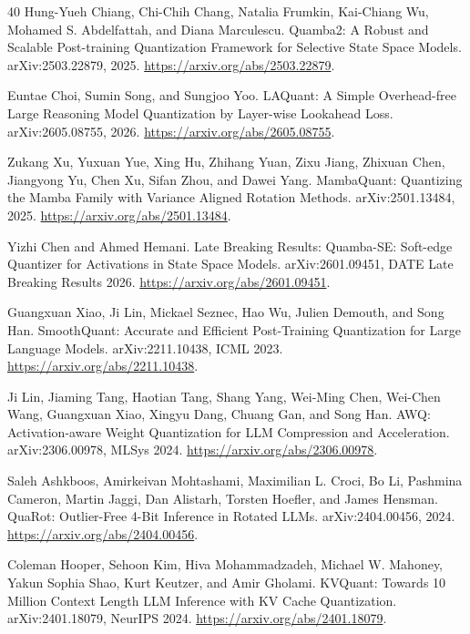 \documentclass{article}
\begin{document}
\begin{thebibliography}{40}
Hung-Yueh Chiang, Chi-Chih Chang, Natalia Frumkin, Kai-Chiang Wu, Mohamed S.
Abdelfattah, and Diana Marculescu.
\newblock Quamba2: A Robust and Scalable Post-training Quantization Framework
for Selective State Space Models.
\newblock arXiv:2503.22879, 2025.
\newblock \url{https://arxiv.org/abs/2503.22879}.

Euntae Choi, Sumin Song, and Sungjoo Yoo.
\newblock LAQuant: A Simple Overhead-free Large Reasoning Model Quantization
by Layer-wise Lookahead Loss.
\newblock arXiv:2605.08755, 2026.
\newblock \url{https://arxiv.org/abs/2605.08755}.

Zukang Xu, Yuxuan Yue, Xing Hu, Zhihang Yuan, Zixu Jiang, Zhixuan Chen,
Jiangyong Yu, Chen Xu, Sifan Zhou, and Dawei Yang.
\newblock MambaQuant: Quantizing the Mamba Family with Variance Aligned
Rotation Methods.
\newblock arXiv:2501.13484, 2025.
\newblock \url{https://arxiv.org/abs/2501.13484}.

Yizhi Chen and Ahmed Hemani.
\newblock Late Breaking Results: Quamba-SE: Soft-edge Quantizer for
Activations in State Space Models.
\newblock arXiv:2601.09451, DATE Late Breaking Results 2026.
\newblock \url{https://arxiv.org/abs/2601.09451}.

Guangxuan Xiao, Ji Lin, Mickael Seznec, Hao Wu, Julien Demouth, and Song Han.
\newblock SmoothQuant: Accurate and Efficient Post-Training Quantization for
Large Language Models.
\newblock arXiv:2211.10438, ICML 2023.
\newblock \url{https://arxiv.org/abs/2211.10438}.

Ji Lin, Jiaming Tang, Haotian Tang, Shang Yang, Wei-Ming Chen, Wei-Chen Wang,
Guangxuan Xiao, Xingyu Dang, Chuang Gan, and Song Han.
\newblock AWQ: Activation-aware Weight Quantization for LLM Compression and
Acceleration.
\newblock arXiv:2306.00978, MLSys 2024.
\newblock \url{https://arxiv.org/abs/2306.00978}.

Saleh Ashkboos, Amirkeivan Mohtashami, Maximilian L. Croci, Bo Li, Pashmina
Cameron, Martin Jaggi, Dan Alistarh, Torsten Hoefler, and James Hensman.
\newblock QuaRot: Outlier-Free 4-Bit Inference in Rotated LLMs.
\newblock arXiv:2404.00456, 2024.
\newblock \url{https://arxiv.org/abs/2404.00456}.

Coleman Hooper, Sehoon Kim, Hiva Mohammadzadeh, Michael W. Mahoney, Yakun
Sophia Shao, Kurt Keutzer, and Amir Gholami.
\newblock KVQuant: Towards 10 Million Context Length LLM Inference with KV
Cache Quantization.
\newblock arXiv:2401.18079, NeurIPS 2024.
\newblock \url{https://arxiv.org/abs/2401.18079}.


\end{thebibliography}
\end{document}
